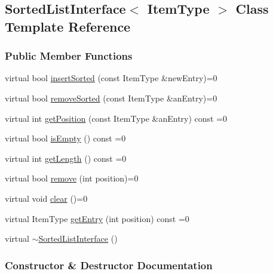 \hypertarget{class_sorted_list_interface}{}\subsection{Sorted\+List\+Interface$<$ Item\+Type $>$ Class Template Reference}
\label{class_sorted_list_interface}
\subsubsection*{Public Member Functions}
\begin{DoxyCompactItemize}
\item 
virtual bool \hyperlink{class_sorted_list_interface_a0d007da05c3c8b7bf79ca49d9e847f80}{insert\+Sorted} (const Item\+Type \&new\+Entry)=0
\item 
virtual bool \hyperlink{class_sorted_list_interface_a1d3e8563466eaa5bf83194b7605415f9}{remove\+Sorted} (const Item\+Type \&an\+Entry)=0
\item 
virtual int \hyperlink{class_sorted_list_interface_afee100702e36fa36f51d552bbc73cd06}{get\+Position} (const Item\+Type \&an\+Entry) const =0
\item 
virtual bool \hyperlink{class_sorted_list_interface_ab0af7dc09abfc8f9f952036cc3f8796e}{is\+Empty} () const =0
\item 
virtual int \hyperlink{class_sorted_list_interface_a87ef0eb556e3562c56af440ed533b9fa}{get\+Length} () const =0
\item 
virtual bool \hyperlink{class_sorted_list_interface_a7fefb851921800f8922a40e35ed8e857}{remove} (int position)=0
\item 
virtual void \hyperlink{class_sorted_list_interface_ac51f6d42fd5c85b8dd7345c60c05d294}{clear} ()=0
\item 
virtual Item\+Type \hyperlink{class_sorted_list_interface_a885144819e36390d2f5531707939f58c}{get\+Entry} (int position) const =0
\item 
virtual \hyperlink{class_sorted_list_interface_af9d9ce08375db3e036603246513f85d9}{$\sim$\+Sorted\+List\+Interface} ()
\end{DoxyCompactItemize}


\subsubsection{Constructor \& Destructor Documentation}
